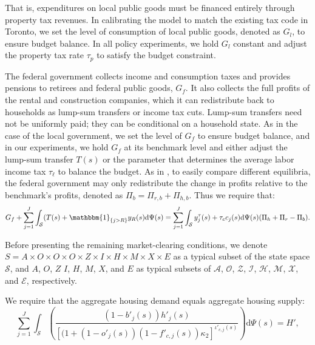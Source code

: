\documentclass[parskip=full]{article}
\begin{document}
\noindent That is, expenditures on local public goods must be financed entirely through property tax revenues. In calibrating the model to match the existing tax code in Toronto, we set the level of consumption of local public goods, denoted as $G_l$, to ensure budget balance. In all policy experiments, we hold $G_l$ constant and adjust the property tax rate $\tau_{p}$ to satisfy the budget constraint.

The federal government collects income and consumption taxes and provides pensions to retirees and federal public goods, $G_{f}$. It also collects the full profits of the rental and construction companies, which it can redistribute back to households as lump-sum transfers or income tax cuts. Lump-sum transfers need not be uniformly paid; they can be conditional on a household state. As in the case of the local government, we set the level of $G_{f}$ to ensure budget balance, and in our experiments, we hold $G_{f}$ at its benchmark level and either adjust the lump-sum transfer $T(s)$ or the parameter that determines the average labor income tax $\tau_{\ell}$ to balance the budget. As in \citet{kkk-2021}, to easily compare different equilibria, the federal government may only redistribute the change in profits relative to the benchmark's profits, denoted as $\Pi_b=\Pi_{r,b}+\Pi_{h,b}$. Thus we require that:
\begin{align}\label{eq:gbc_2}
   G_{f}+\sum_{j=1}^J \int_\mathcal{S} (T(s)+\mathbbm{1}_{\{j>R\}} y_{R}(s) \mathrm{d}\Psi(s)=\sum_{j=1}^J \int_\mathcal{S} y^{\tau}_{j}(s)+\tau_{c}c_{j}(s)\mathrm{d}\Psi(s) (\Pi_h+\Pi_r-\Pi_b).
\end{align}

Before presenting the remaining market-clearing conditions, we denote $S=A\times O \times O \times O \times Z \times I \times H\times M\times X \times E$ as a typical subset of the state space $\mathcal{S}$, and $A$, $O$, $Z$ $I$, $H$, $M$, $X$, and $E$ as typical subsets of $\mathcal{A}$, $\mathcal{O}$, $\mathcal{Z}$, $\mathcal{I}$, $\mathcal{H}$, $\mathcal{M}$, $\mathcal{X}$, and $\mathcal{E}$, respectively.

We require that the aggregate housing demand equals aggregate housing supply:
\begin{equation}
\label{eq:housing_clearing_condition}
  \sum_{j=1}^J \int_\mathcal{S}  \left(\frac{(1-b'_{j}(s))h'_{j}(s)}{\left[(1+(1-o'_{j}(s))(1-f'_{c,j}(s))\kappa_{2}\right]^{\iota'_{c,j}(s)}}\right) \mathrm{d}\Psi(s) = H',
\end{equation}
\end{document}
